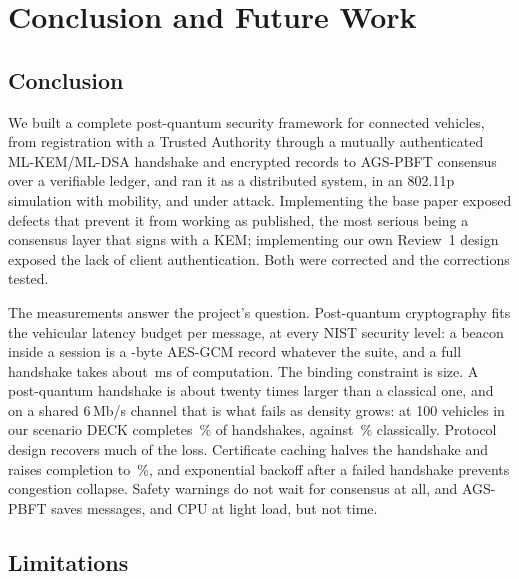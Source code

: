 \chapter{Conclusion and Future Work}
\label{ch:conc}

\section{Conclusion}

We built a complete post-quantum security framework for connected vehicles,
from registration with a Trusted Authority through a mutually authenticated
ML-KEM/ML-DSA handshake and encrypted records to AGS-PBFT consensus over a
verifiable ledger, and ran it as a distributed system, in an 802.11p
simulation with mobility, and under attack. Implementing the base paper
exposed defects that prevent it from working as published, the most serious
being a consensus layer that signs with a KEM; implementing our own Review~1
design exposed the lack of client authentication. Both were corrected and the
corrections tested.

The measurements answer the project's question. Post-quantum cryptography
fits the vehicular latency budget per message, at every NIST security level:
a beacon inside a session is a
-byte AES-GCM record whatever the suite, and a full
handshake takes about \,ms of computation. The binding
constraint is size. A post-quantum handshake is about twenty times larger
than a classical one, and on a shared 6\,Mb/s channel that is what fails as
density grows: at 100 vehicles in our scenario DECK completes
\,\% of handshakes, against
\,\% classically. Protocol design recovers much of
the loss. Certificate caching halves the handshake and raises completion to
\,\%, and exponential backoff after a failed
handshake prevents congestion collapse. Safety warnings do not wait
for consensus at all, and AGS-PBFT saves messages, and CPU at light load, but not time.

\section{Limitations}


